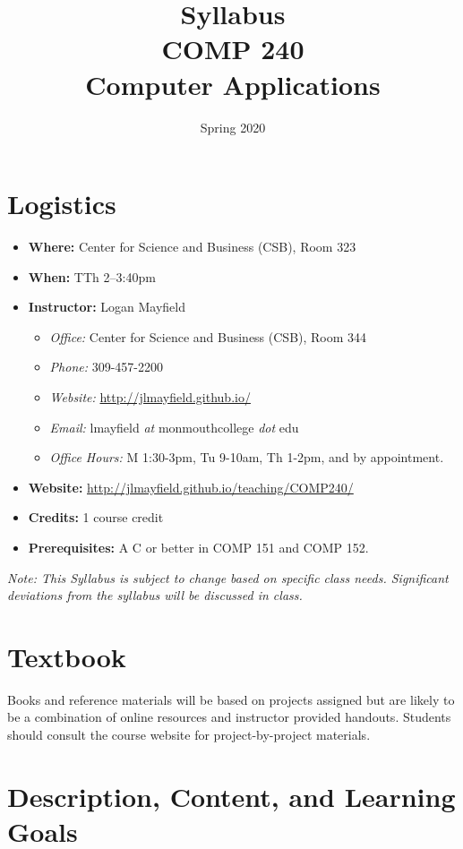 \documentclass[10pt]{article}
\title{Syllabus \\ COMP 240 \\ Computer Applications}
\author{  }
\date{Spring 2020}
\begin{document}
\maketitle

\section{Logistics}
\begin{itemize}
\item \textbf{Where: } Center for Science and Business (CSB), Room 323
\item \textbf{When: } TTh 2--3:40pm
\item \textbf{Instructor: } Logan Mayfield
\begin{itemize}
\item \textit{Office: } Center for Science and Business (CSB), Room 344
\item \textit{Phone: } 309-457-2200 %
\item \textit{Website: } \url{http://jlmayfield.github.io/}
\item \textit{Email: } lmayfield \textit{at} monmouthcollege \textit{dot} edu
\item \textit{Office Hours: }  M 1:30-3pm, Tu 9-10am, Th 1-2pm, and by appointment.
\end{itemize}
\item \textbf{Website: } \url{http://jlmayfield.github.io/teaching/COMP240/}
\item \textbf{Credits: } 1 course credit
\item \textbf{Prerequisites: } A C or better in COMP 151 and COMP 152.
\end{itemize}
\emph{Note: This Syllabus is subject to change based on specific class needs. Significant deviations from the syllabus will be discussed in class.}

\section{Textbook}

Books and reference materials will be based on projects assigned but are likely to be a combination of online resources and instructor provided handouts.  Students should consult the course website for project-by-project materials.

\section{Description, Content, and Learning Goals}
\end{document}
